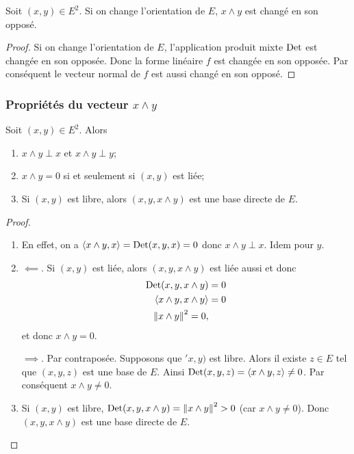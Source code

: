     \begin{prop}
      Soit \((x,y) \in E^2\). Si on change l'orientation de \(E\), \(x \wedge y\) est changé en son opposé.
    \end{prop}
    \begin{proof}
      Si on change l'orientation de \(E\), l'application produit mixte \(\operatorname{Det}\) est changée en son opposée. Donc la forme linéaire \(f\) est changée en son opposée. Par conséquent le vecteur normal de \(f\) est aussi changé en son opposé.
    \end{proof}

    \subsubsection{Propriétés du vecteur \(x \wedge y\)}

    \begin{theo}
      Soit \((x,y) \in E^2\). Alors
      \begin{enumerate}
        \item \(x \wedge y \perp x\) et \(x \wedge y \perp y\);
        \item \(x \wedge y = 0\) si et seulement si \((x,y)\) est liée;
        \item Si \((x,y)\) est libre, alors \((x,y,x \wedge y)\) est une base directe de \(E\).
      \end{enumerate}
    \end{theo}
    \begin{proof}
      \begin{enumerate}
        \item En effet, on a \(\left\langle{x \wedge y},{x}\right\rangle=\operatorname{Det}(x,y,x)=0\) donc \(x \wedge y \perp x\). Idem pour \(y\).
        \item \(\impliedby\). Si \((x,y)\) est liée, alors \((x,y,x\wedge y)\) est liée aussi et donc
          \begin{align}
            \operatorname{Det}(x,y,x\wedge y) &= 0\\
            \left\langle{x\wedge y},{x\wedge y}\right\rangle &= 0 \\
            \left\lVert x\wedge y\right\rVert^2=0,
          \end{align}
          et donc \(x \wedge y=0\).

          \(\implies\). Par contraposée. Supposons que \('x,y)\) est libre. Alors il existe \(z \in E\) tel que \((x,y,z)\) est une base de \(E\). Ainsi \(\operatorname{Det}(x,y,z)=\left\langle{x\wedge y},{z}\right\rangle\neq 0\). Par conséquent \(x\wedge y \neq 0\).
        \item Si \((x,y)\) est libre, \(\operatorname{Det}(x,y,x \wedge y)=\left\lVert x \wedge y\right\rVert^2 >0\) (car \(x \wedge y \neq 0\)). Donc \((x,y,x \wedge y)\) est une base directe de \(E\).
      \end{enumerate}
    \end{proof}

